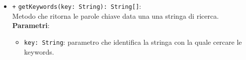 \begin{itemize}
\begin{itemize}
\begin{itemize}
		\end{itemize}
		\item \texttt{+} \texttt{getKeywords(key: String): String[]}: \\ Metodo che ritorna le parole chiave data una una stringa di ricerca. 
	\textbf{Parametri}:
	\begin{itemize}
		\item \texttt{key: String}: parametro che identifica la stringa con la quale cercare le keywords. 
	\end{itemize}
		\end{itemize}
\end{itemize}